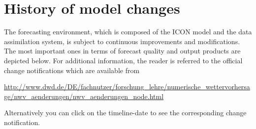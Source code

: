 \chapter{History of model changes}

The forecasting environment, which is composed of the ICON model and the data assimilation system, 
is subject to continuous improvements and modifications. The most important ones in terms of forecast 
quality and output products are depicted below. For additional information, the reader is referred to the 
official change notifications which are available from
\begin{note}
\url{http://www.dwd.de/DE/fachnutzer/forschung_lehre/numerische_wettervorhersage/nwv_aenderungen/nwv_aenderungen_node.html}
\end{note}
Alternatively you can click on the timeline-date to see the corresponding change notification.

